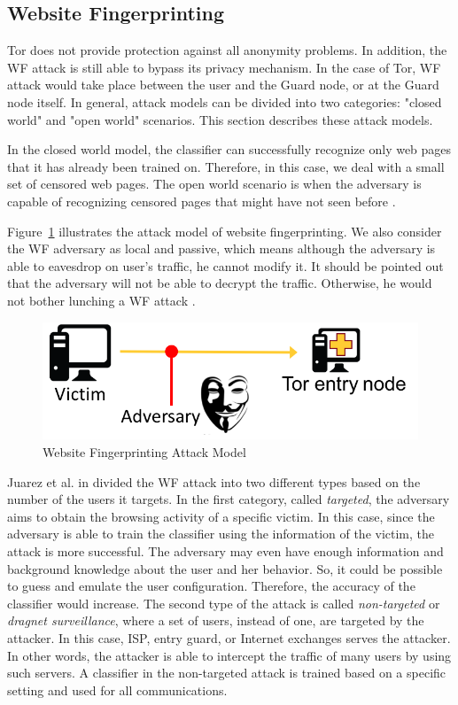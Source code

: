 \subsection{Website Fingerprinting}

Tor does not provide protection against all anonymity problems. In addition, the WF attack is still able to bypass its privacy mechanism. In the case of Tor, WF attack would take place between the user and the Guard node, or at the Guard node itself. In general, attack models can be divided into two categories: "closed world" and "open world" scenarios.  This section describes these attack models.

In the closed world model, the classifier can successfully recognize only web pages that it has already been trained on. Therefore, in this case, we deal with a small set of censored web pages. The open world scenario is when the adversary is capable of recognizing censored pages that might have not seen before \cite{TorBlog}.


Figure~\ref{fig:attack} illustrates the attack model of website fingerprinting. We also consider the WF adversary as local and passive, which means although the adversary is able to eavesdrop on user's traffic, he cannot modify it. It should be pointed out that the adversary will not be able to decrypt the traffic. Otherwise, he would not bother lunching a WF attack \cite{juarez14}.


\begin{figure}[h]
\includegraphics[width=0.7\columnwidth]{figures/attack_model.png}
\centering
\caption{Website Fingerprinting Attack Model~\cite{juarez14}}
\label{fig:attack}
\end{figure}


Juarez et al. in \cite{juarez14} divided the WF attack into two different types based on the number of the users it targets. In the first category, called \emph{targeted}, the adversary aims to obtain the browsing activity of a specific victim. In this case, since the adversary is able to train the classifier using the information of the victim, the attack is more successful. The adversary may even have enough information and background knowledge about the user and her behavior. So, it could be possible to guess and emulate the user configuration. Therefore, the accuracy of the classifier would increase. The second type of the attack is called \emph{non-targeted} or \emph{dragnet surveillance}, where a set of users, instead of one, are targeted by the attacker. In this case, ISP, entry guard, or Internet exchanges serves the attacker.  In other words, the attacker is able to intercept the traffic of many users by using such servers. A classifier in the non-targeted attack is trained based on a specific setting and used for all communications.


